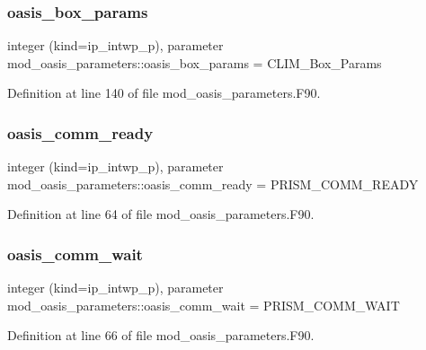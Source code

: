 \subsubsection{\texorpdfstring{oasis\+\_\+box\+\_\+params}{oasis\_box\_params}}
{\footnotesize\ttfamily integer (kind=ip\+\_\+intwp\+\_\+p), parameter mod\+\_\+oasis\+\_\+parameters\+::oasis\+\_\+box\+\_\+params = C\+L\+I\+M\+\_\+\+Box\+\_\+\+Params}



Definition at line 140 of file mod\+\_\+oasis\+\_\+parameters.\+F90.

\mbox{\label{namespacemod__oasis__parameters_a8484e196ef7469adbeaef850787d7502}} 
\subsubsection{\texorpdfstring{oasis\+\_\+comm\+\_\+ready}{oasis\_comm\_ready}}
{\footnotesize\ttfamily integer (kind=ip\+\_\+intwp\+\_\+p), parameter mod\+\_\+oasis\+\_\+parameters\+::oasis\+\_\+comm\+\_\+ready = P\+R\+I\+S\+M\+\_\+\+C\+O\+M\+M\+\_\+\+R\+E\+A\+DY}



Definition at line 64 of file mod\+\_\+oasis\+\_\+parameters.\+F90.

\mbox{\label{namespacemod__oasis__parameters_a9df795bd9123857642aae31661b6c13a}} 
\subsubsection{\texorpdfstring{oasis\+\_\+comm\+\_\+wait}{oasis\_comm\_wait}}
{\footnotesize\ttfamily integer (kind=ip\+\_\+intwp\+\_\+p), parameter mod\+\_\+oasis\+\_\+parameters\+::oasis\+\_\+comm\+\_\+wait = P\+R\+I\+S\+M\+\_\+\+C\+O\+M\+M\+\_\+\+W\+A\+IT}



Definition at line 66 of file mod\+\_\+oasis\+\_\+parameters.\+F90.

